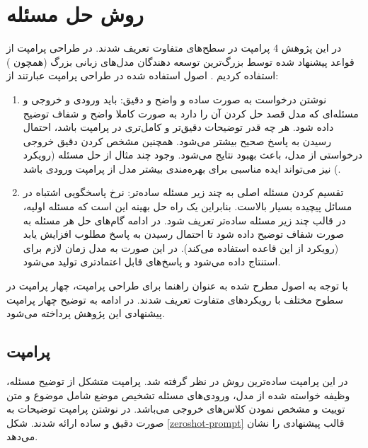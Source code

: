 \section{روش حل مسئله}
در این پژوهش 4 پرامپت در سطح‌های متفاوت تعریف شدند. در طراحی پرامپت از قواعد پیشنهاد شده توسط بزرگ‌ترین توسعه دهندگان مدل‌های زبانی بزرگ (همچون 
) استفاده کردیم
.
اصول استفاده شده در طراحی پرامپت عبارتند از:
\begin{enumerate}
	\item نوشتن درخواست به صورت ساده و واضح و دقیق: باید ورودی و خروجی و مسئله‌ای که مدل قصد حل کردن آن را دارد به صورت کاملا واضح و شفاف توضیح داده شود. هر چه قدر توضیحات دقیق‌تر و کامل‌تری در پرامپت  باشد، احتمال رسیدن به پاسخ صحیح بیشتر می‌شود. همچنین مشخص کردن دقیق خروجی درخواستی از مدل، باعث بهبود نتایج می‌شود. وجود چند مثال از حل مسئله (رویکرد
\cite{10.5555/3495724.3495883}) 
نیز می‌تواند ایده مناسبی برای بهره‌مندی بیشتر مدل از پرامپت ورودی باشد.

\item تقسیم کردن مسئله اصلی به چند زیر مسئله ساده‌تر: نرخ پاسخگویی اشتباه در مسائل پیچیده بسیار بالاست. بنابراین یک راه حل بهینه این است که مسئله اولیه، در قالب چند زیر مسئله ساده‌تر تعریف شود. در ادامه گام‌های حل هر مسئله به صورت شفاف توضیح داده‌ شود تا احتمال رسیدن به پاسخ مطلوب افزایش یابد (رویکرد
از این قاعده استفاده می‌کند). در این صورت به مدل زمان لازم برای استنتاج داده می‌شود و پاسخ‌های قابل اعتمادتری تولید می‌شود.
\end{enumerate}

با توجه به اصول مطرح شده به عنوان راهنما برای طراحی پرامپت، چهار پرامپت در سطوح مختلف با رویکرد‌های متفاوت تعریف شدند. در ادامه به توضیح چهار پرامپت پیشنهادی این پژوهش پرداخته می‌شود.

\subsection{پرامپت
}
در این پرامپت ساده‌ترین روش در نظر گرفته شد. پرامپت متشکل از توضیح مسئله، وظیفه خواسته شده از مدل، ورودی‌های مسئله تشخیص موضع شامل موضوع
و متن توییت و مشخص نمودن کلاس‌های خروجی می‌باشد. در نوشتن پرامپت توضیحات به صورت دقیق و ساده ارائه شدند. شکل
\ref{zeroshot-prompt}
قالب پیشنهادی را نشان می‌دهد. 

